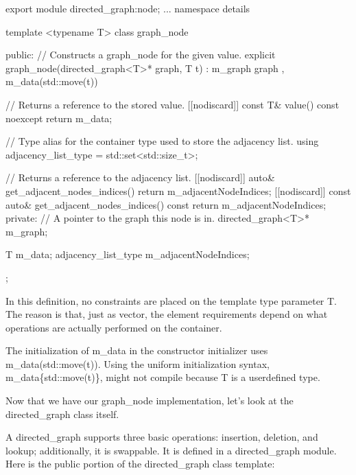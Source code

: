 \begin{cpp}
export module directed_graph:node;
...
namespace details
{
    template <typename T>
    class graph_node
    {
        public:
            // Constructs a graph_node for the given value.
            explicit graph_node(directed_graph<T>* graph, T t)
            : m_graph { graph }, m_data(std::move(t)) { }

            // Returns a reference to the stored value.
            [[nodiscard]] const T& value() const noexcept { return m_data; }

            // Type alias for the container type used to store the adjacency list.
            using adjacency_list_type = std::set<std::size_t>;

            // Returns a reference to the adjacency list.
            [[nodiscard]] auto& get_adjacent_nodes_indices() {
                return m_adjacentNodeIndices; }
            [[nodiscard]] const auto& get_adjacent_nodes_indices() const {
                return m_adjacentNodeIndices; }
        private:
            // A pointer to the graph this node is in.
            directed_graph<T>* m_graph;

            T m_data;
            adjacency_list_type m_adjacentNodeIndices;
    };
}
\end{cpp}

In this definition, no constraints are placed on the template type parameter T. The reason is that, just as vector, the element requirements depend on what operations are actually performed on the container.

The initialization of m\_data in the constructor initializer uses m\_data(std::move(t)). Using the uniform initialization syntax, m\_data\{std::move(t)\}, might not compile because T is a userdefined type.

Now that we have our graph\_node implementation, let’s look at the directed\_graph class itself.


A directed\_graph supports three basic operations: insertion, deletion, and lookup; additionally, it is swappable. It is defined in a directed\_graph module. Here is the public portion of the directed\_graph class template:


